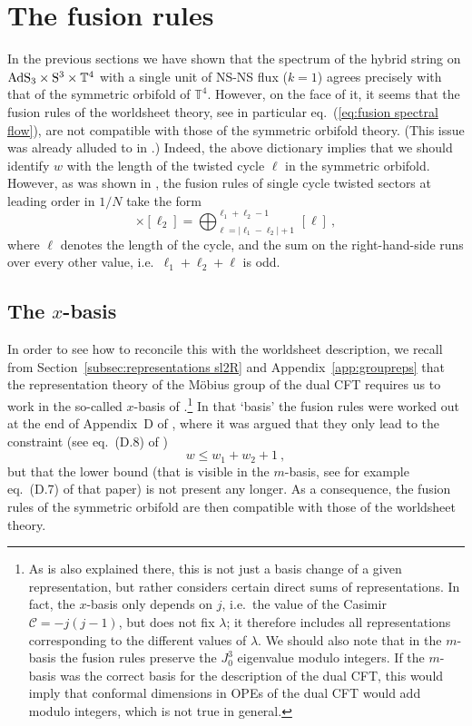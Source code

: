\documentclass[12pt,a4paper]{article}
\newcommand{\be}{\begin{equation}}
\newcommand{\ee}{\end{equation}}
\begin{document}
\section{The fusion rules} \label{sec:fusion rules dual CFT}

In the previous sections we have shown that the spectrum of the hybrid string on ${\rm AdS}_3 \times {\rm S}^3 \times \mathbb{T}^4$ with a single unit of NS-NS flux ($k=1$) agrees precisely with that of the symmetric orbifold of $\mathbb{T}^4$. However, on the face of it, it seems that the fusion rules of the worldsheet theory, see in particular eq.~(\ref{eq:fusion spectral flow}), are not compatible with those of the symmetric orbifold theory. (This issue was already alluded to in \cite{Giribet:2018ada}.) Indeed, the above dictionary implies that we should identify $w$ with the length of the twisted cycle $\ell$ in the symmetric orbifold. However, as was shown in \cite{Jevicki:1998bm,Pakman:2009zz,Pakman:2009ab}, the fusion rules of single cycle twisted sectors at leading order in $1/N$ take the form 
\be
[\ell_1] \times [\ell_2]  = \bigoplus_{\ell=|\ell_1-\ell_2|+1}^{\ell_1+\ell_2-1} \, [\ell] \ , \label{eq:symmetric product fusion rules}
\ee
where $\ell$ denotes the length of the cycle, and the sum on the right-hand-side runs  over every other value, i.e.\ $\ell_1+\ell_2+\ell$ is odd. 

\subsection{The $x$-basis}

In order to see how to reconcile this with the worldsheet description, we recall from Section~\ref{subsec:representations sl2R} and Appendix~\ref{app:groupreps} that the representation theory of the M\"obius group of the dual CFT requires us to work in the so-called $x$-basis of \cite{Maldacena:2000hw}.\footnote{\label{foot:19}As is also explained there, this is not just a basis change of a given representation, but rather considers certain direct sums of representations. In fact, the $x$-basis only depends on $j$, i.e.\ the value of the Casimir $\mathcal{C}=-j(j-1)$, but does not fix $\lambda$; it therefore includes all representations corresponding to the different values of $\lambda$. We should also note that in the $m$-basis the fusion rules preserve the $J^3_0$ eigenvalue modulo integers. If the $m$-basis was the correct basis for the description of the dual CFT, this would imply that conformal dimensions in OPEs of the dual CFT would add modulo integers, which is not true in general.} In that `basis' the fusion rules were worked out at the end of Appendix~D of \cite{Maldacena:2001km}, where it was argued that they only lead to the constraint (see eq.~(D.8) of \cite{Maldacena:2001km})
\be\label{weakerfusion}
w \leq w_1+w_2 + 1 \ , 
\ee
but that the lower bound (that is visible in the $m$-basis, see for example eq.~(D.7) of that paper) is not present any longer. As a consequence, the fusion rules of the symmetric orbifold are then compatible with those of the worldsheet theory. 
\smallskip
\end{document}
